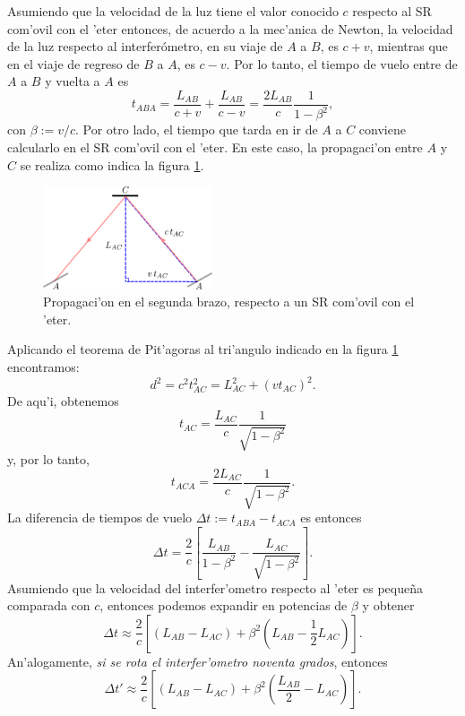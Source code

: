 Asumiendo que la velocidad de la luz tiene el valor conocido $c$ respecto al SR com'ovil con el 'eter entonces, de acuerdo a la mec'anica de Newton, la velocidad de la luz respecto al interfer\'ometro, en su viaje de $A$ a $B$, es $c+v$, mientras que en el viaje de regreso de $B$ a $A$, es $c-v$. Por lo tanto, el tiempo de vuelo entre de $A$ a $B$ y vuelta a $A$ es
\begin{equation} \label{eq:michelson1}
t_{ABA}=\frac{L_{AB}}{c+v}+\frac{L_{AB}}{c-v}=\frac{2L_{AB}}{c}\frac{1}{1-\beta^2},
\end{equation}
con $\beta:=v/c$. Por otro lado, el tiempo que tarda en ir de $A$ a $C$ conviene calcularlo en el SR com'ovil con el 'eter. En este caso, la propagaci'on entre $A$ y $C$ se realiza como indica la figura \ref{fig:michelson2}.
\begin{figure}[H]
\begin{center}
\includegraphics[width=5cm]{fig/fig-interferometro-2.pdf}
\end{center}
\caption{Propagaci'on en el segunda brazo, respecto a un SR com'ovil con el 'eter.} \label{fig:michelson2}
\end{figure}
Aplicando el teorema de Pit'agoras al tri'angulo indicado en la figura \ref{fig:michelson2} encontramos:
\begin{equation}\label{eq:michelson2}
 d^2=c^2t_{AC}^2=L_{AC}^2+(vt_{AC})^2.
\end{equation}
De aqu'i, obtenemos
\begin{equation}
 t_{AC}=\frac{L_{AC}}{c}\frac{1}{\sqrt{1-\beta^2}}
\end{equation}
y, por lo tanto,
\begin{equation} \label{eq:michelson4}
t_{ACA}=\frac{2L_{AC}}{c}\frac{1}{\sqrt{1-\beta^2}}.
\end{equation}
La diferencia de tiempos de vuelo $\Delta t:=t_{ABA}-t_{ACA}$ es entonces
\begin{equation} \label{eq:michelson5}
\Delta t=\frac{2}{c}\left[\frac{L_{AB}}{1-\beta^2}-\frac{L_{AC}}{\sqrt{1-\beta^2}}\right].
\end{equation}
Asumiendo que la velocidad del interfer'ometro respecto al 'eter es peque\~na comparada con $c$, entonces podemos expandir en potencias de $\beta$ y obtener
\begin{equation} \label{eq:michelson6}
\Delta t\approx\frac{2}{c}\left[(L_{AB}-L_{AC})+\beta^2(L_{AB}-\frac{1}{2}L_{AC})\right].
\end{equation}
An'alogamente, \textit{si se rota el interfer'ometro noventa grados}, entonces 
\begin{equation}
\Delta t'\approx\frac{2}{c}\left[(L_{AB}-L_{AC})+\beta^2(\frac{L_{AB}}{2}-L_{AC})\right].
\end{equation}

